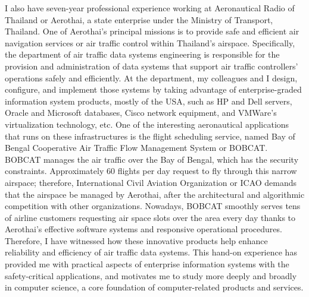 \documentclass[a4paper,10pt]{report}
\begin{document}
\vspace{0.2cm}
I also have seven-year professional experience working at Aeronautical Radio of Thailand or Aerothai, a state enterprise under the Ministry of Transport, Thailand. One of Aerothai's principal missions is to provide safe and efficient air navigation services or air traffic control within Thailand's airspace. Specifically, the department of air traffic data systems engineering is responsible for the provision and administration of data systems that support air traffic controllers' operations safely and efficiently. At the department, my colleagues and I design, configure, and implement those systems by taking advantage of enterprise-graded information system products, mostly of the USA, such as HP and Dell servers, Oracle and Microsoft databases, Cisco network equipment, and VMWare's virtualization technology, etc. One of the interesting aeronautical applications that runs on these infrastructures is the flight scheduling service, named Bay of Bengal Cooperative Air Traffic Flow Management System or BOBCAT. BOBCAT manages the air traffic over the Bay of Bengal, which has the security constraints. Approximately 60 flights per day request to fly through this narrow airspace; therefore, International Civil Aviation Organization or ICAO demands that the airspace be managed by Aerothai, after the architectural and algorithmic competition with other organizations. Nowadays, BOBCAT smoothly serves tens of airline customers requesting air space slots over the area every day thanks to Aerothai's effective software systems and responsive operational procedures.  Therefore, I have witnessed how these innovative products help enhance reliability and efficiency of air traffic data systems. This hand-on experience has provided me with practical aspects of enterprise information systems with the safety-critical applications, and motivates me to study more deeply and broadly in computer science, a core foundation of computer-related products and services. 
\end{document}
